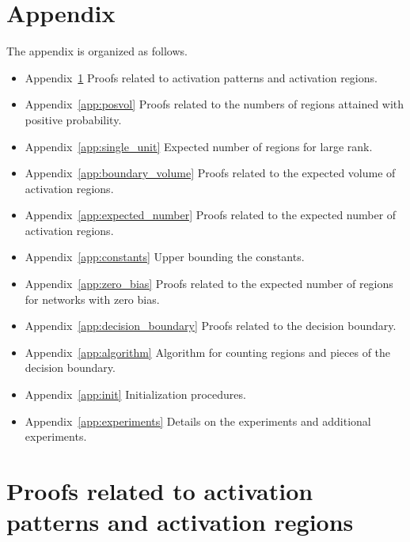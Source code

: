 \documentclass{article}
\theoremstyle{definition}
\begin{document}
\appendix

\section*{Appendix} 

The appendix is organized as follows. 
\begin{itemize}[leftmargin=*]
    \item Appendix~\ref{app:intro_proofs} Proofs related to activation patterns and activation regions. 
    \item Appendix~\ref{app:posvol} Proofs related to the numbers of regions attained with positive probability. 
    \item Appendix~\ref{app:single_unit} Expected number of regions for large rank. 
    \item Appendix~\ref{app:boundary_volume} Proofs related to the expected volume of activation regions. 
    \item Appendix~\ref{app:expected_number} Proofs related to the expected number of activation regions. 
    \item Appendix~\ref{app:constants} Upper bounding the constants. 
    \item Appendix~\ref{app:zero_bias} Proofs related to the expected number of regions for networks with zero bias. 
    \item Appendix~\ref{app:decision_boundary} Proofs related to the decision boundary. 
    \item Appendix~\ref{app:algorithm} Algorithm for counting regions and pieces of the decision boundary. 
    \item Appendix~\ref{app:init} Initialization procedures. 
    \item Appendix~\ref{app:experiments} Details on the experiments and additional experiments. 
\end{itemize}

\section{Proofs related to activation patterns and activation regions}
\label{app:intro_proofs}  
\end{document}
